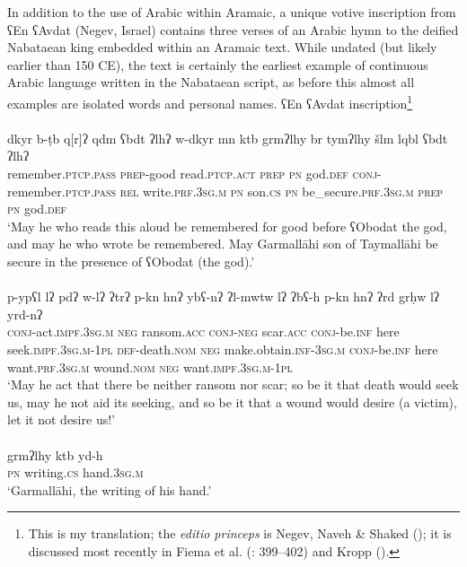\documentclass[output=paper]{langsci/langscibook}
\begin{document}
In addition to the use of Arabic within Aramaic, a unique votive inscription from ʕEn ʕAvdat (Negev, Israel) contains three verses of an Arabic hymn to the deified Nabataean king  embedded within an Aramaic text. While undated (but likely earlier than 150 CE), the text is certainly the earliest example of continuous Arabic language written in the Nabataean script, as before this almost all examples are isolated words and personal names.
\newpage
\ea ʕEn ʕAvdat inscription\footnote{This is my translation; the \textit{editio princeps} is Negev, Naveh \& Shaked (\citeyear{Negevetal1986}); it is discussed most recently in Fiema et al. (\citeyear{Fiemaetal2015}: 399–402) and Kropp (\citeyear{Kropp2017}).} \\
 \\ 
\gll    dkyr b-ṭb q[r]ʔ qdm ʕbdt ʔlhʔ w-dkyr mn ktb grmʔlhy br tymʔlhy šlm lqbl ʕbdt ʔlhʔ \\
remember.\textsc{ptcp.pass} \textsc{prep}-good read.\textsc{ptcp.act} \textsc{prep} \textsc{pn} god.\textsc{def} \textsc{conj}-remember.\textsc{ptcp.pass} \textsc{rel} write.\textsc{prf.3sg.m} \textsc{pn} son.\textsc{cs} \textsc{pn} be\_secure.\textsc{prf.3sg.m} \textsc{prep} \textsc{pn} god.\textsc{def} \\ 
\glt `May he who reads this aloud be remembered for good before ʕObodat the god, and may he who wrote be remembered. May Garmallāhi son of Taymallāhi be secure in the presence of ʕObodat (the god).'\\

 \\
\gll   p-ypʕl lʔ pdʔ w-lʔ ʔtrʔ p-kn hnʔ ybʕ-nʔ ʔl-mwtw lʔ ʔbʕ-h p-kn hnʔ ʔrd grḥw lʔ yrd-nʔ \\
       \textsc{conj}-act.\textsc{impf.3sg.m} \textsc{neg} ransom.\textsc{acc} \textsc{conj}-\textsc{neg} scar.\textsc{acc} \textsc{conj}-be.\textsc{inf} here seek.\textsc{impf.3sg.m-1pl} \textsc{def}-death.\textsc{nom} \textsc{neg} make.obtain.\textsc{inf-3sg.m} \textsc{conj}-be.\textsc{inf} here want.\textsc{prf.3sg.m} wound.\textsc{nom} \textsc{neg} want.\textsc{impf.3sg.m-1pl} \\
\glt `May he act that there be neither ransom nor scar; so be it that death would seek us, may he not aid its seeking, and so be it that a wound would desire (a victim), let it not desire us!'\\

 \\
\gll   grmʔlhy ktb yd-h \\
\textsc{pn} writing.\textsc{cs} hand.\textsc{3sg.m} \\
\glt `Garmallāhi, the writing of his hand.’\\
\z
\z
\end{document}
